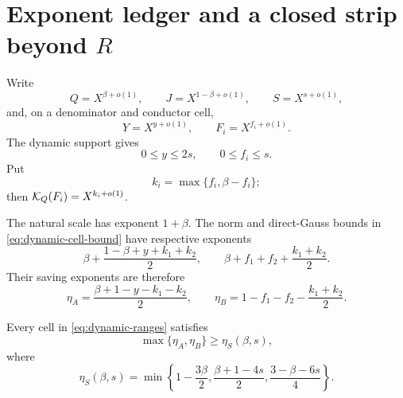 \section{Exponent ledger and a closed strip beyond
\texorpdfstring{\(R\)}{R}}
\label{sec:exponent-strip}

Write
\begin{equation}
 Q=X^{\beta+o(1)},\qquad J=X^{1-\beta+o(1)},
 \qquad S=X^{s+o(1)},
 \label{eq:exponent-main}
\end{equation}
and, on a denominator and conductor cell,
\begin{equation}
 Y=X^{y+o(1)},\qquad F_i=X^{f_i+o(1)}.
 \label{eq:exponent-cells}
\end{equation}
The dynamic support gives
\begin{equation}
 0\le y\le2s,\qquad 0\le f_i\le s.
 \label{eq:dynamic-ranges}
\end{equation}
Put
\begin{equation}
 k_i=\max\{f_i,\beta-f_i\};
 \label{eq:ki}
\end{equation}
then \(\mathcal K_Q(F_i)=X^{k_i+o(1)}\).

The natural scale has exponent \(1+\beta\).  The norm and direct-Gauss
bounds in \eqref{eq:dynamic-cell-bound} have respective exponents
\[
 \beta+\frac{1-\beta+y+k_1+k_2}{2},
 \qquad
 \beta+f_1+f_2+\frac{k_1+k_2}{2}.
\]
Their saving exponents are therefore
\begin{equation}
 \eta_A=\frac{\beta+1-y-k_1-k_2}{2},
 \qquad
 \eta_B=1-f_1-f_2-\frac{k_1+k_2}{2}.
 \label{eq:etaAB}
\end{equation}

\begin{proposition}
\label{prop:dynamic-ledger}
Every cell in \eqref{eq:dynamic-ranges} satisfies
\begin{equation}
 \max\{\eta_A,\eta_B\}\ge \eta_S(\beta,s),
 \label{eq:etaS-bound}
\end{equation}
where
\begin{equation}
 \boxed{
 \eta_S(\beta,s)=
 \min\left\{
 1-\frac{3\beta}{2},
 \frac{\beta+1-4s}{2},
 \frac{3-\beta-6s}{4}
 \right\}.}
 \label{eq:etaS}
\end{equation}
\end{proposition}

